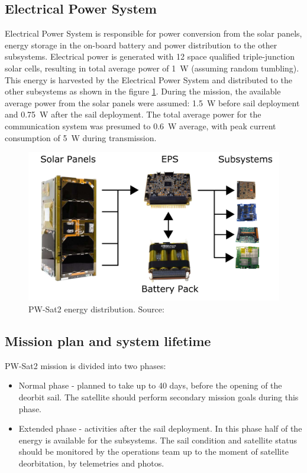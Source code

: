 \subsection{Electrical Power System}
Electrical Power System is responsible for power conversion from the solar panels, energy storage in the on-board battery and power distribution to the other subsystems. Electrical power is generated with \si{12} space qualified triple-junction solar cells, resulting in total average power of \SI{1}{\watt} (assuming random tumbling). This energy is harvested by the Electrical Power System and distributed to the other subsystems as shown in the figure \ref{pwsat_eps_distribution}. During the mission, the available average power from the solar panels were assumed: \SI{1.5}{\watt} before sail deployment and \SI{0.75}{\watt} after the sail deployment. The total average power for the communication system was presumed to \SI{0.6}{\watt} average, with peak current consumption of \SI{5}{\watt} during transmission.
\begin{figure}
    \centering
    \includegraphics[width=0.7\paperwidth]{img/1/pwsat_eps_distribution.png}
    \caption{PW-Sat2 energy distribution. Source: \cite{PW_sat2_photo}}
    \label{pwsat_eps_distribution}
\end{figure}

\subsection{Mission plan and system lifetime}
PW-Sat2 mission is divided into two phases:
\begin{itemize}
    \item Normal phase - planned to take up to 40 days, before the opening of the deorbit sail. The satellite should perform secondary mission goals during this phase.
    \item Extended phase - activities after the sail deployment. In this phase half of the energy is available for the subsystems. The sail condition and satellite status should be monitored by the operations team up to the moment of satellite deorbitation, by telemetries and photos.
\end{itemize}
